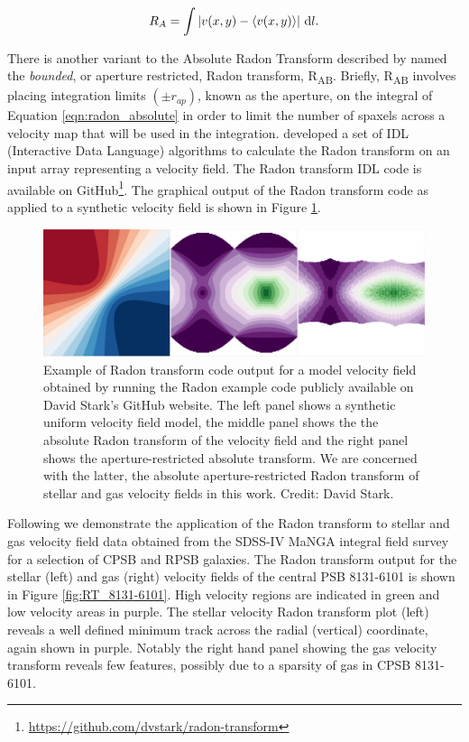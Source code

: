 \begin{equation}
    \label{eqn:radon_absolute}
    R_A=\int{| v(x,y) - \langle v(x,y) \rangle | \, \mathop{}\!\mathrm{d}l}.
\end{equation}

There is another variant to the Absolute Radon Transform described by \citet{2018MNRAS.480.2217S} named the \textit{bounded}, or aperture restricted, Radon transform, R\textsubscript{AB}. Briefly, R\textsubscript{AB} involves placing integration limits $(\pm{r_{ap}})$, known as the aperture, on the integral of Equation \ref{eqn:radon_absolute} in order to limit the number of spaxels across a velocity map that will be used in the integration. \citet{2018MNRAS.480.2217S} developed a set of IDL (Interactive Data Language) algorithms to calculate the Radon transform on an input array representing a velocity field. The Radon transform IDL code is available on GitHub\footnote{\href{https://github.com/dvstark/radon-transform}{https://github.com/dvstark/radon-transform}}. 
The graphical output of the Radon transform code as applied to a synthetic velocity field is shown in Figure \ref{fig:Radon}.

\begin{figure}
    \centering
   	\includegraphics[width=\columnwidth]{images/RadonPlots/example.png}
    \caption[Model velocity field Radon transform plots]{Example of Radon transform code output for a model velocity field obtained by running the Radon example code publicly available on David Stark's GitHub website. The left panel shows a synthetic uniform velocity field model, the middle panel shows the the absolute Radon transform of the velocity field and the right panel shows the aperture-restricted absolute transform. We are concerned with the latter, the absolute aperture-restricted Radon transform of stellar and gas velocity fields in this work. Credit: David Stark.}
    \label{fig:Radon}
\end{figure}

Following \citet{2018MNRAS.480.2217S} we demonstrate the application of the Radon transform to stellar and gas velocity field data obtained from the SDSS-IV MaNGA integral field survey for a selection of CPSB and RPSB galaxies. The Radon transform output for the stellar (left) and gas (right) velocity fields of the central PSB 8131-6101 is shown in Figure \ref{fig:RT_8131-6101}. High velocity regions are indicated in green and low velocity areas in purple. The stellar velocity Radon transform plot (left) reveals a well defined minimum track across the radial (vertical) coordinate, again shown in purple. Notably the right hand panel showing the gas velocity transform reveals few features, possibly due to a sparsity of gas in CPSB 8131-6101.

